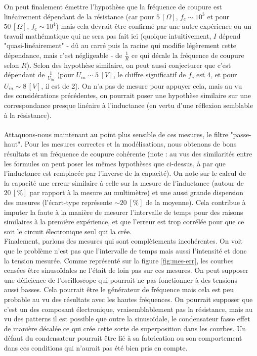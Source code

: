 On peut finalement émettre l'hypothèse que la fréquence de coupure est linéairement dépendant de la résistance (car pour $5 \ [\Omega]$, $f_c \sim 10^3$ et pour $50 \ [\Omega]$, $f_c \sim 10^4$) mais cela devrait être confirmé par une autre expérience ou un travail mathématique qui ne sera pas fait ici (quoique intuitivement, $I$ dépend "quasi-linéairement" - dû au carré puis la racine qui modifie légèrement cette dépendance, mais c'est négligeable - de $\frac{1}{R}$ ce qui décale la fréquence de coupure selon $R$). Selon des hypothèse similaire, on peut aussi conjecturer que c'est dépendant de $\frac{1}{U_{in}}$ (pour $U_{in} \sim 5 \ [V]$, le chiffre significatif de $f_c$ est 4, et pour $U_{in} \sim 8 \ [V]$, il est de 2). On n'a pas de mesure pour appuyer cela, mais au vu des considérations précédentes, on pourrait poser une hypothèse similaire sur une correspondance presque linéaire à l'inductance (en vertu d'une réflexion semblable à la résistance).\\ \\
Attaquons-nous maintenant au point plus sensible de ces mesures, le filtre "passe-haut". Pour les mesures correctes et la modélisations, nous obtenons de bons résultats et un fréquence de coupure cohérente (note : au vus des similarités entre les formules on peut poser les mêmes hypothèses que ci-dessus, à par que l'inductance est remplacée par l'inverse de la capacité). On note sur le calcul de la capacité une erreur similaire à celle sur la mesure de l'inductance (autour de $20 \ [\%]$ par rapport à la mesure au multimètre) et une aussi grande dispersion des mesures (l'écart-type représente $\sim 20 \ [\%]$ de la moyenne). Cela contribue à imputer la faute à la manière de mesurer l'intervalle de temps pour des raisons similaires à la première expérience, et que l'erreur est trop corrélée pour que ce soit le circuit électronique seul qui la crée.\\
Finalement, parlons des mesures qui sont complètements incohérentes. On voit que le problème n'est pas que l'intervalle de temps mais aussi l'intensité et donc la tension mesurée. Comme représenté sur la figure \ref{fig:mes-err}, les courbes censées être sinusoïdales ne l'était de loin pas sur ces mesures. On peut supposer une déficience de l'oscilloscope qui pourrait ne pas fonctionner à des tensions aussi basses. Cela pourrait être le générateur de fréquence mais cela est peu probable au vu des résultats avec les hautes fréquences. On pourrait supposer que c'est un des composant électronique, vraisemblablement pas la résistance, mais au vu des patterns il est possible que outre la sinusoïdale, le condensateur fasse effet de manière décalée ce qui crée cette sorte de superposition dans les courbes. Un défaut du condensateur pourrait être lié à sa fabrication ou son comportement dans ces conditions qui n'aurait pas été bien pris en compte.\\
